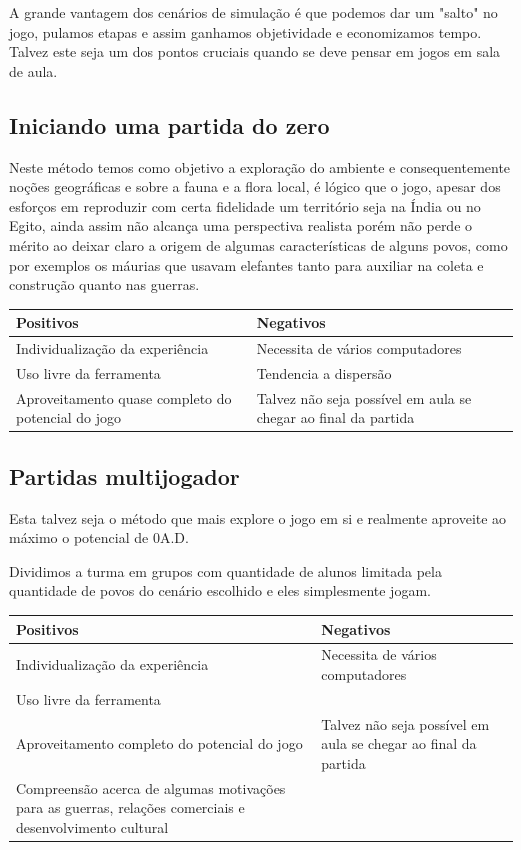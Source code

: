\documentclass[article,11pt, a4paper,sumario=tradicional]{abntex2}
\begin{document}
        A grande vantagem dos cenários de simulação é que podemos dar um "salto" no jogo, pulamos etapas e assim ganhamos objetividade e economizamos tempo. Talvez este seja um dos pontos cruciais quando se deve pensar em jogos em sala de aula.

    \subsection*{Iniciando uma partida do zero}
        Neste método temos como objetivo a exploração do ambiente e consequentemente noções geográficas e sobre a fauna e a flora local, é lógico que o jogo, apesar dos esforços em reproduzir com certa fidelidade um território seja na Índia ou no Egito, ainda assim não alcança uma perspectiva realista porém não perde o mérito ao deixar claro a origem de algumas características de alguns povos, como por exemplos os máurias que usavam elefantes tanto para auxiliar na coleta e construção quanto nas guerras.

        \begin{tabular}{|p{5cm}|p{5cm}|}
        	\hline 
            \textbf{Positivos} & \textbf{Negativos} \\ 
        	\hline 
            Individualização da experiência & Necessita de vários computadores \\ 
            \hline
            Uso livre da ferramenta & Tendencia a dispersão \\
        	\hline 
            Aproveitamento quase completo do potencial do jogo & Talvez não seja possível em aula se chegar ao final da partida \\
        	\hline 
        \end{tabular}

   \subsection*{Partidas multijogador}
        Esta talvez seja o método que mais explore o jogo em si e realmente aproveite ao máximo o potencial de 0A.D.

        Dividimos a turma em grupos com quantidade de alunos limitada pela quantidade de povos do cenário escolhido e eles simplesmente jogam.
        
        \begin{tabular}{|p{5cm}|p{5cm}|}
        	\hline 
            \textbf{Positivos} & \textbf{Negativos} \\ 
        	\hline 
            Individualização da experiência & Necessita de vários computadores \\ 
            \hline
            Uso livre da ferramenta & \\
        	\hline 
            Aproveitamento completo do potencial do jogo & Talvez não seja possível em aula se chegar ao final da partida \\
        	\hline 
            Compreensão acerca de algumas motivações para as guerras, relações comerciais e desenvolvimento cultural & \\
        	\hline 
        \end{tabular}
        
\end{document}
